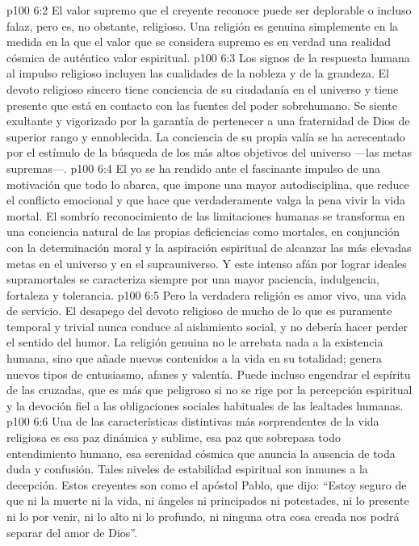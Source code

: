 \vs p100 6:2 El valor supremo que el creyente reconoce puede ser deplorable o incluso falaz, pero es, no obstante, religioso. Una religión es genuina simplemente en la medida en la que el valor que se considera supremo es en verdad una realidad cósmica de auténtico valor espiritual.
\vs p100 6:3 Los signos de la respuesta humana al impulso religioso incluyen las cualidades de la nobleza y de la grandeza. El devoto religioso sincero tiene conciencia de su ciudadanía en el universo y tiene presente que está en contacto con las fuentes del poder sobrehumano. Se siente exultante y vigorizado por la garantía de pertenecer a una fraternidad de Dios de superior rango y ennoblecida. La conciencia de su propia valía se ha acrecentado por el estímulo de la búsqueda de los más altos objetivos del universo ---las metas supremas---.
\vs p100 6:4 El yo se ha rendido ante el fascinante impulso de una motivación que todo lo abarca, que impone una mayor autodisciplina, que reduce el conflicto emocional y que hace que verdaderamente valga la pena vivir la vida mortal. El sombrío reconocimiento de las limitaciones humanas se transforma en una conciencia natural de las propias deficiencias como mortales, en conjunción con la determinación moral y la aspiración espiritual de alcanzar las más elevadas metas en el universo y en el suprauniverso. Y este intenso afán por lograr ideales supramortales se caracteriza siempre por una mayor paciencia, indulgencia, fortaleza y tolerancia.
\vs p100 6:5 Pero la verdadera religión es amor vivo, una vida de servicio. El desapego del devoto religioso de mucho de lo que es puramente temporal y trivial nunca conduce al aislamiento social, y no debería hacer perder el sentido del humor. La religión genuina no le arrebata nada a la existencia humana, sino que añade nuevos contenidos a la vida en su totalidad; genera nuevos tipos de entusiasmo, afanes y valentía. Puede incluso engendrar el espíritu de las cruzadas, que es más que peligroso si no se rige por la percepción espiritual y la devoción fiel a las obligaciones sociales habituales de las lealtades humanas.
\vs p100 6:6 \pc Una de las características distintivas más sorprendentes de la vida religiosa es esa paz dinámica y sublime, esa paz que sobrepasa todo entendimiento humano, esa serenidad cósmica que anuncia la ausencia de toda duda y confusión. Tales niveles de estabilidad espiritual son inmunes a la decepción. Estos creyentes son como el apóstol Pablo, que dijo: “Estoy seguro de que ni la muerte ni la vida, ni ángeles ni principados ni potestades, ni lo presente ni lo por venir, ni lo alto ni lo profundo, ni ninguna otra cosa creada nos podrá separar del amor de Dios”.
